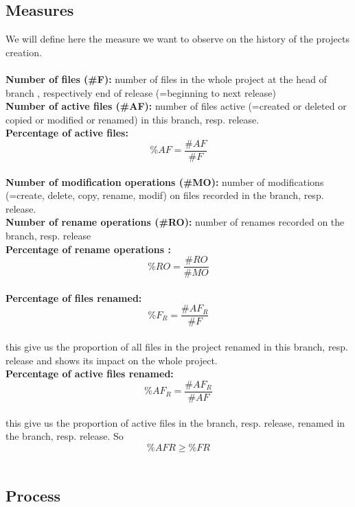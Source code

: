 \subsection{Measures}
We will define here the measure we want to observe on the history of the projects creation.\\\\	
\textbf{Number of files (\#F):} number of files in the whole project at the head of branch , respectively end of release (=beginning to next release)\\
\textbf{Number of active files (\#AF):} number of files active (=created or deleted or copied or modified or renamed) in this branch, resp. release.\\
\textbf{Percentage of active files:\\}
\[ \%AF = \frac{\#AF}{\#F} \] \\
\textbf{Number of modification operations (\#MO):}  number of modifications (=create, delete, copy, rename, modif) on files recorded in the branch, resp. release.\\
\textbf{Number of rename operations (\#RO):} number of renames recorded on the branch, resp. release\\
\textbf{Percentage of rename operations :}\\
\[ \%RO = \frac{\#RO}{\#MO}  \] \\
\textbf{Percentage of files renamed:}\\
\[ \%F_{R} = \frac{\#AF_{R}}{\#F} \] \\
this give us the proportion of all files in the project renamed in this branch, resp. release and shows its impact on the whole project.\\
\textbf{Percentage of active files renamed:}
\[ \%AF_{R} = \frac{\#AF_{R}}{\#AF} \]\\
this give us the proportion of active files in the branch, resp. release, renamed in the branch, resp. release. So \[ \%AFR \geq \%FR \] \\
\label{subsec:Measures}

\subsection{Process}

